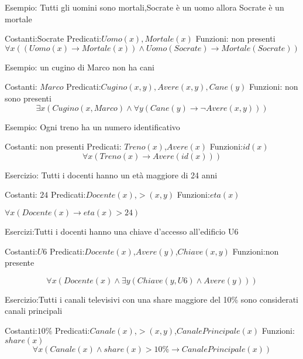 Esempio: Tutti gli uomini sono mortali,Socrate è un uomo allora Socrate è un mortale

Costanti:Socrate \newline
Predicati:$Uomo(x),Mortale(x)$ \newline
Funzioni: non presenti \newline
\begin{equation*}
\forall x ((Uomo(x) \rightarrow Mortale(x)) \land Uomo(Socrate) \rightarrow Mortale(Socrate))
\end{equation*}

Esempio: un cugino di Marco non ha cani

Costanti: $Marco$\newline
Predicati:$Cugino(x,y),Avere(x,y),Cane(y)$\newline
Funzioni: non sono presenti
\begin{equation*}
\exists x (Cugino(x,Marco) \land \forall y (Cane(y) \rightarrow \neg Avere(x,y)))
\end{equation*}

Esempio: Ogni treno ha un numero identificativo

Costanti: non presenti \newline
Predicati: $Treno(x)$,$Avere(x)$\newline
Funzioni:$id(x)$
\begin{equation*}
\forall x (Treno(x) \rightarrow Avere(id(x)))
\end{equation*}

Esercizio: Tutti i docenti hanno un età maggiore di 24 anni

Costanti: $24$
Predicati:$Docente(x)$,$>(x,y)$
Funzioni:$eta(x)$

$\forall x (Docente(x) \rightarrow eta(x) > 24)$

Esercizi:Tutti i docenti hanno una chiave d'accesso all'edificio U6

Costanti:$U6$
Predicati:$Docente(x)$,$Avere(y)$,$Chiave(x,y)$
Funzioni:non presente

\begin{equation*}
    \forall x (Docente(x) \land \exists y (Chiave(y,U6) \land Avere(y)))
\end{equation*}

Esercizio:Tutti i canali televisivi con una share maggiore del 10\% sono
          considerati canali principali

Costanti:$10\%$
Predicati:$Canale(x)$,$>(x,y)$,$CanalePrincipale(x)$
Funzioni:$share(x)$
\begin{equation*}
    \forall x (Canale(x) \land share(x) > 10\% \rightarrow CanalePrincipale(x))
\end{equation*}

